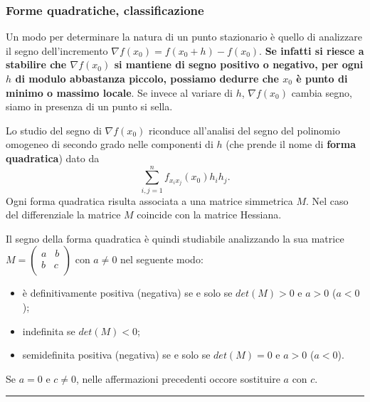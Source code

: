 \subsubsection{Forme quadratiche, classificazione}
Un modo per determinare la natura di un punto stazionario è quello di analizzare il segno dell'incremento $\nabla f(x_0) = f(x_0 + h ) - f(x_0)$. \textbf{Se infatti si riesce a stabilire che $\nabla f(x_0)$ si mantiene di segno positivo o negativo, per ogni $h$ di modulo abbastanza piccolo, possiamo dedurre che $x_0$ è punto di minimo o massimo locale}. Se invece al variare di $h$, $\nabla f(x_0)$ cambia segno, siamo in presenza di un punto si sella.\newline
\begin{tcolorbox}
Lo studio del segno di $\nabla f(x_0)$ riconduce all'analisi del segno del polinomio omogeneo di secondo grado nelle componenti di $h$ (che prende il nome di \textbf{forma quadratica}) dato da
\[
    \sum_{i,j=1}^{n}f_{x_ix_j}(x_0)h_ih_j.
\]
Ogni forma quadratica risulta associata a una matrice simmetrica $M$. Nel caso del differenziale la matrice $M$ coincide con la matrice Hessiana.
\end{tcolorbox}
\begin{tcolorbox}
Il segno della forma quadratica è quindi studiabile analizzando la sua matrice $M = \left(\begin{matrix}
    a \;\;\; b\\
    b \;\;\; c\\
\end{matrix} \right)$ con $a\neq 0$ nel seguente modo:
\begin{itemize}
    \item è definitivamente positiva (negativa) se e solo se $det(M)>0$ e $a >0$ ($a<0$);
    \item indefinita se $det(M)<0$;
    \item semidefinita positiva (negativa) se e solo se $det(M)=0$ e $a>0$ ($a<0$).
\end{itemize}
Se $a = 0$ e $c\neq 0$, nelle affermazioni precedenti occore sostituire $a$ con $c$.
\end{tcolorbox}
\rule{\textwidth}{0.4pt}
